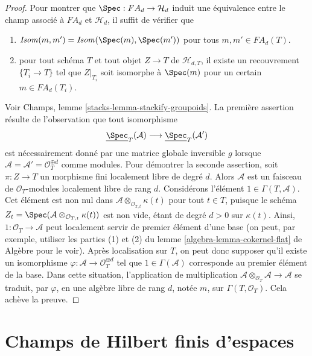 \begin{proof}
\medskip\noindent
Pour montrer que $\Spec : FA_d \to \mathcal{H}_d$ induit une équivalence
entre le champ associé à $FA_d$ et $\mathcal{H}_d$, il suffit de
vérifier que
\begin{enumerate}
\item $\mathit{Isom}(m, m') = \mathit{Isom}(\Spec(m), \Spec(m'))$
pour tous $m, m' \in FA_d(T)$.
\item pour tout schéma $T$ et tout objet $Z \to T$ de $\mathcal{H}_{d, T}$,
il existe un recouvrement $\{T_i \to T\}$ tel que $Z|_{T_i}$ soit
isomorphe à $\Spec(m)$ pour un certain $m \in FA_d(T_i)$.
\end{enumerate}
Voir
Champs, lemme \ref{stacks-lemma-stackify-groupoids}.
La première assertion résulte de l'observation que tout isomorphisme
$$
\underline{\Spec}_T(\mathcal{A})
\longrightarrow
\underline{\Spec}_T(\mathcal{A}')
$$
est nécessairement donné par une matrice globale inversible $g$ lorsque
$\mathcal{A} = \mathcal{A}' = \mathcal{O}_T^{\oplus d}$ comme modules.
Pour démontrer la seconde assertion, soit $\pi : Z \to T$ un morphisme fini
localement libre de degré $d$. Alors $\mathcal{A}$ est un faisceau
de $\mathcal{O}_T$-modules localement libre de rang $d$.
Considérons l'élément $1 \in \Gamma(T, \mathcal{A})$. Cet élément est
non nul dans $\mathcal{A} \otimes_{\mathcal{O}_{T, t}} \kappa(t)$
pour tout $t \in T$, puisque le schéma
$Z_t = \Spec(\mathcal{A} \otimes_{\mathcal{O}_{T, t}} \kappa(t))$
est non vide, étant de degré $d > 0$ sur $\kappa(t)$. Ainsi,
$1 : \mathcal{O}_T \to \mathcal{A}$ peut localement servir de premier
élément d'une base (on peut, par exemple, utiliser les parties (1) et (2) du
lemme \ref{algebra-lemma-cokernel-flat} de Algèbre
pour le voir). Après localisation sur
$T$, on peut donc supposer qu'il existe un isomorphisme
$\varphi : \mathcal{A} \to \mathcal{O}_T^{\oplus d}$
tel que $1 \in \Gamma(\mathcal{A})$ corresponde au premier élément de la base.
Dans cette situation, l'application de multiplication
$\mathcal{A} \otimes_{\mathcal{O}_T} \mathcal{A} \to \mathcal{A}$
se traduit, par $\varphi$, en une algèbre libre de rang $d$, notée $m$, sur
$\Gamma(T, \mathcal{O}_T)$. Cela achève la preuve.
\end{proof}




\section{Champs de Hilbert finis d'espaces}
\label{section-spaces-hilbert}

